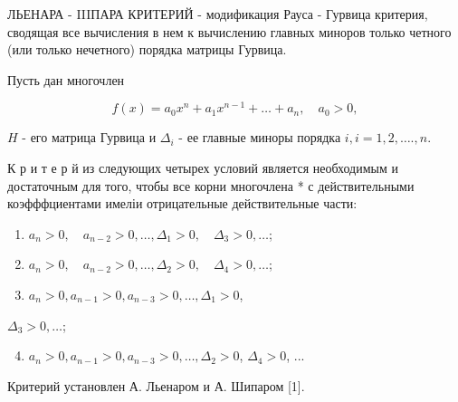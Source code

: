 \documentclass[10pt]{article}
\begin{document}
ЛЬЕНАРА - IIIПАРА КРИТЕРИЙ - модификация Рауса - Гурвица критерия, сводящая все вычисления в нем к вычислению главных миноров только четного (или только нечетного) порядка матрицы Гурвица.



Пусть дан многочлен



\[

f(x)=a_{0} x^{n}+a_{1} x^{n-1}+\ldots+a_{n}, \quad a_{0}>0,

\]



$H$ - его матрица Гурвица и $\Delta_{i}$ - ее главные миноры порядка $i, i=1,2, \ldots ., n$.



К р и т е р й из следующих четырех условий является необходимым и достаточным для того, чтобы все корни многочлена * с действительными коэфффциентами имеліи отрицательные действительные части:



\begin{enumerate}

  \item $a_{n}>0, \quad a_{n-2}>0, \ldots, \Delta_{1}>0, \quad \Delta_{3}>0, \ldots$;



  \item $a_{n}>0, \quad a_{n-2}>0, \ldots, \Delta_{2}>0, \quad \Delta_{4}>0, \ldots$;



  \item $a_{n}>0, a_{n-1}>0, a_{n-3}>0, \ldots, \Delta_{1}>0$,



\end{enumerate}



$\Delta_{3}>0, \ldots$;



\begin{enumerate}

  \setcounter{enumi}{3}

  \item $a_{n}>0, a_{n-1}>0, a_{n-3}>0, \ldots, \Delta_{2}>0$, $\Delta_{4}>0$, ...

\end{enumerate}



Критерий установлен А. Льенаром и А. Шипаром [1].
\end{document}
